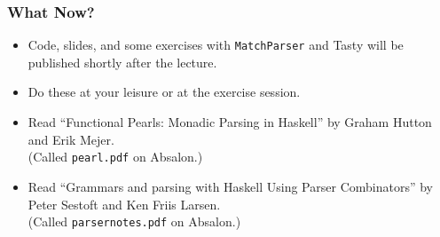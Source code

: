 \begin{frame}

\frametitle{What Now?}

\vspace{\fill}

\begin{itemize}

\item Code, slides, and some exercises with \texttt{MatchParser} and Tasty will
be published shortly after the lecture.

\item Do these at your leisure or at the exercise session.

\item Read ``Functional Pearls: Monadic Parsing in Haskell'' by Graham Hutton
and Erik Mejer. \\ (Called \texttt{pearl.pdf} on Absalon.)

\item Read ``Grammars and parsing with Haskell Using Parser Combinators'' by
Peter Sestoft and Ken Friis Larsen. \\ (Called \texttt{parsernotes.pdf} on
Absalon.)

\end{itemize}

\vspace{\fill}

\end{frame}
